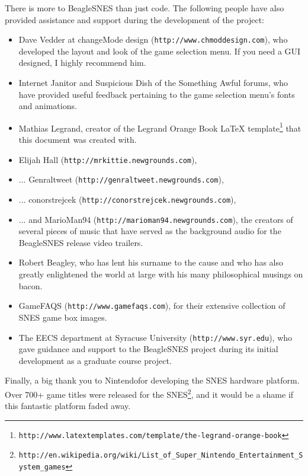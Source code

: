 \noindent{}There is more to BeagleSNES than just code.  The following people have also provided assistance and support during the development of the project:

\begin{itemize}
\item Dave Vedder at changeMode design (\texttt{http://www.chmoddesign.com}), who developed the layout and look of the game selection menu.  If you need a GUI designed, I highly recommend him.
\item Internet Janitor and Suspicious Dish of the Something Awful forums, who have provided useful feedback pertaining to the game selection menu's fonts and animations.
\item Mathias Legrand, creator of the Legrand Orange Book LaTeX template\footnote{\texttt{http://www.latextemplates.com/template/the-legrand-orange-book}} that this document was created with.
\item Elijah Hall (\texttt{http://mrkittie.newgrounds.com}), 
\item ... Genraltweet  (\texttt{http://genraltweet.newgrounds.com}), 
\item ... conorstrejcek (\texttt{http://conorstrejcek.newgrounds.com}), 
\item ... and MarioMan94 (\texttt{http://marioman94.newgrounds.com}), the creators of several pieces of music that have served as the background audio for the BeagleSNES release video trailers.
\item Robert Beagley, who has lent his surname to the cause and who has also greatly enlightened the world at large with his many philosophical musings on bacon.
\item GameFAQS (\texttt{http://www.gamefaqs.com}), for their extensive collection of SNES game box images.
\item The EECS department at Syracuse University (\texttt{http://www.syr.edu}), who gave guidance and support to the BeagleSNES project during its initial development as a graduate course project.
\end{itemize}

\noindent{}Finally, a big thank you to Nintendo\textregistered for developing the SNES hardware platform.  Over 700+ game titles were released for the SNES\footnote{\texttt{http://en.wikipedia.org/wiki/List\_of\_Super\_Nintendo\_Entertainment\_System\_games}}, and it would be a shame if this fantastic platform faded away.

